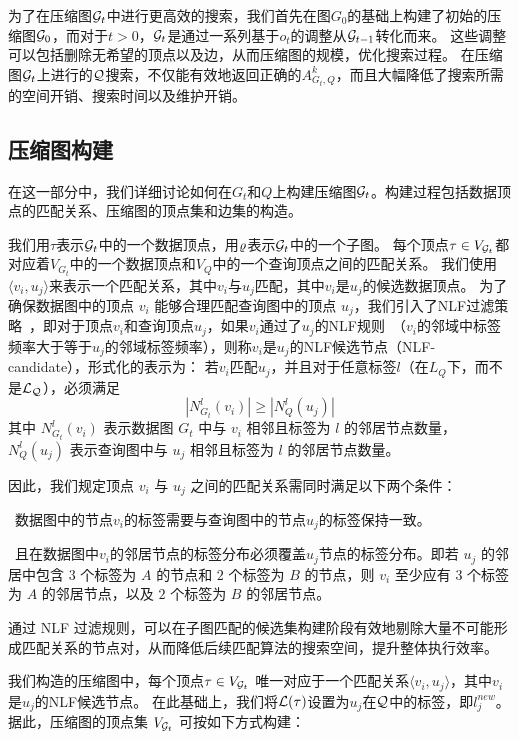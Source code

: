 为了在压缩图$\mathcal{G}_t$中进行更高效的搜索，我们首先在图$G_0$的基础上构建了初始的压缩图$\mathcal{G}_0$，而对于$t>0$，$\mathcal{G}_t$是通过一系列基于$o_t$的调整从$\mathcal{G}_{t-1}$转化而来。
这些调整可以包括删除无希望的顶点以及边，从而压缩图的规模，优化搜索过程。
在压缩图$\mathcal{G}_t$上进行的$\mathcal{Q}$搜索，不仅能有效地返回正确的$A_{G_t, Q}^k$，而且大幅降低了搜索所需的空间开销、搜索时间以及维护开销。

\subsection{压缩图构建}
\label{s-sec:compact-graph-construction}

在这一部分中，我们详细讨论如何在$G_t$和$Q$上构建压缩图$\mathcal{G}_t$。构建过程包括数据顶点的匹配关系、压缩图的顶点集和边集的构造。

我们用$\tau$表示$\mathcal{G}_t$中的一个数据顶点，用$\varrho$表示$\mathcal{G}_t$中的一个子图。
每个顶点$\tau \in V_{\mathcal{G}_t}$都对应着$V_{G_t}$中的一个数据顶点和$V_Q$中的一个查询顶点之间的匹配关系。
我们使用$\langle v_i, u_j \rangle$来表示一个匹配关系，其中$v_i$与$u_j$匹配，其中$v_i$是$u_j$的候选数据顶点。
为了确保数据图中的顶点 $v_i$ 能够合理匹配查询图中的顶点 $u_j$，我们引入了NLF过滤策略~\cite{sgi-turbo-iso-DBLP:conf/sigmod/HanLL13}，即对于顶点$v_i$和查询顶点$u_j$，如果$v_i$通过了$u_j$的NLF规则~\cite{sgi-turbo-iso-DBLP:conf/sigmod/HanLL13}（$v_i$的邻域中标签频率大于等于$u_j$的邻域标签频率），则称$v_i$是$u_j$的NLF候选节点（NLF-candidate），形式化的表示为：
若$v_i$匹配$u_j$，并且对于任意标签$l$（在$L_Q$下，而不是$\mathcal{L}_{\mathcal{Q}}$），必须满足
\begin{equation}
|N_{G_t}^l(v_i)| \geq |N_Q^l(u_j)|
\end{equation}
其中 $N_{G_t}^l(v_i)$ 表示数据图 $G_t$ 中与 $v_i$ 相邻且标签为 $l$ 的邻居节点数量，$N_Q^l(u_j)$ 表示查询图中与 $u_j$ 相邻且标签为 $l$ 的邻居节点数量。

因此，我们规定顶点 $v_i$ 与 $u_j$ 之间的匹配关系需同时满足以下两个条件：

\textbullet~数据图中的节点$v_i$的标签需要与查询图中的节点$u_j$的标签保持一致。

\textbullet~且在数据图中$v_i$的邻居节点的标签分布必须覆盖$u_j$节点的标签分布。即若 $u_j$ 的邻居中包含 $3$ 个标签为 $A$ 的节点和 $2$ 个标签为 $B$ 的节点，则 $v_i$ 至少应有 $3$ 个标签为 $A$ 的邻居节点，以及 $2$ 个标签为 $B$ 的邻居节点。

通过 NLF 过滤规则，可以在子图匹配的候选集构建阶段有效地剔除大量不可能形成匹配关系的节点对，从而降低后续匹配算法的搜索空间，提升整体执行效率。

我们构造的压缩图中，每个顶点$\tau \in V_{\mathcal{G}_t}$ 唯一对应于一个匹配关系$\langle v_i, u_j \rangle$，其中$v_i$是$u_j$的NLF候选节点。
在此基础上，我们将$\mathcal{L}(\tau)$设置为$u_j$在$\mathcal{Q}$中的标签，即$l_j^{new}$。
据此，压缩图的顶点集 $V_{\mathcal{G}_t}$ 可按如下方式构建：

